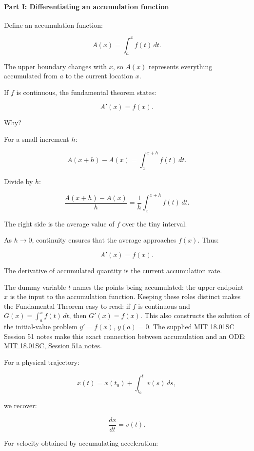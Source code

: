 \paragraph{Part I: Differentiating an accumulation function}\label{02-foundations-ii-ch022-part-i-differentiating-an-accumulation-function}

Define an accumulation function:

\[
A(x)=\int_a^x f(t)\,dt.
\]

The upper boundary changes with \(x\), so \(A(x)\) represents everything accumulated from \(a\) to the current location \(x\).

If \(f\) is continuous, the fundamental theorem states:

\[
\boxed{A'(x)=f(x)}.
\]

Why?

For a small increment \(h\):

\[
A(x+h)-A(x)=\int_x^{x+h}f(t)\,dt.
\]

Divide by \(h\):

\[
\frac{A(x+h)-A(x)}h = \frac1h\int_x^{x+h}f(t)\,dt.
\]

The right side is the average value of \(f\) over the tiny interval.

As \(h\to0\), continuity ensures that the average approaches \(f(x)\). Thus:

\[
A'(x)=f(x).
\]

The derivative of accumulated quantity is the current accumulation rate.

The dummy variable \(t\) names the points being accumulated; the upper endpoint \(x\) is the input to the accumulation function. Keeping these roles distinct makes the Fundamental Theorem easy to read: if \(f\) is continuous and \(G(x)=\int_a^x f(t)\,dt\), then \(G'(x)=f(x)\). This also constructs the solution of the initial-value problem \(y'=f(x)\), \(y(a)=0\). The supplied MIT 18.01SC Session 51 notes make this exact connection between accumulation and an ODE: \href{https://ocw.mit.edu/courses/18-01sc-single-variable-calculus-fall-2010/2459faee7ec3308afd5cca2b95fad48e_MIT18_01SCF10_Ses51a.pdf}{MIT 18.01SC, Session 51a notes}.

For a physical trajectory:

\[
x(t)=x(t_0)+\int_{t_0}^{t}v(s)\,ds,
\]

we recover:

\[
\frac{dx}{dt}=v(t).
\]

For velocity obtained by accumulating acceleration:

